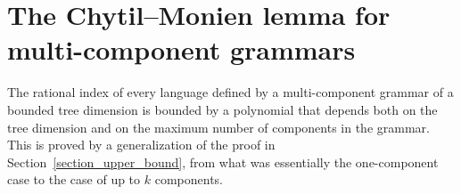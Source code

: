 \documentclass[runningheads]{llncs}
\renewcommand{\epsilon}{\varepsilon}
\begin{document}

\section{The Chytil--Monien lemma for multi-component grammars}\label{section_multi_upper_bound}

The rational index of every language
defined by a multi-component grammar of a bounded tree dimension
is bounded by a polynomial that depends both on the tree dimension
and on the maximum number of components in the grammar.
This is proved by a generalization of the proof in Section~\ref{section_upper_bound},
from what was essentially the one-component case to the case of up to $k$ components.
\end{document}

